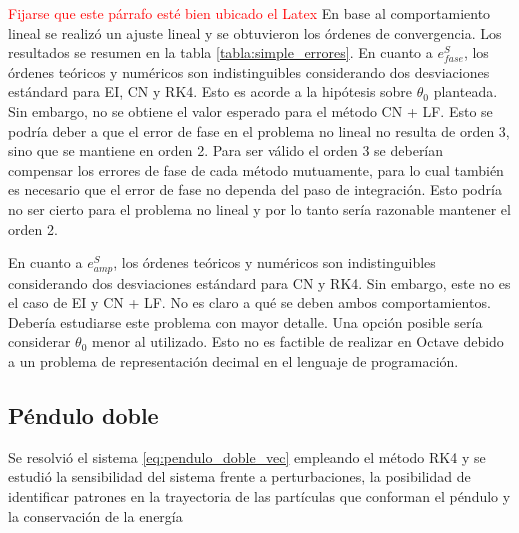 \documentclass[aps,prb,twocolumn,superscriptaddress,floatfix,longbibliography]{revtex4-2}
\newcounter{para}
\begin{document}
\twocolumngrid


\hfill

\textcolor{red}{Fijarse que este párrafo esté bien ubicado el Latex} En base al comportamiento lineal se realizó un ajuste lineal y se obtuvieron los órdenes de convergencia. Los resultados se resumen en la tabla \ref{tabla:simple_errores}. En cuanto a $e^S_{fase}$, los órdenes teóricos y numéricos son indistinguibles considerando dos desviaciones estándard para EI, CN y RK4. Esto es acorde a la hipótesis sobre $\theta_0$ planteada. Sin embargo, no se obtiene el valor esperado para el método CN + LF. Esto se podría deber a que el error de fase en el problema no lineal no resulta de orden 3, sino que se mantiene en orden 2. Para ser válido el orden 3 se deberían compensar los errores de fase de cada método mutuamente, para lo cual también es necesario que el error de fase no dependa del paso de integración. Esto podría no ser cierto para el problema no lineal y por lo tanto sería razonable mantener el orden 2.

En cuanto a $e^S_{amp}$, los órdenes teóricos y numéricos son indistinguibles considerando dos desviaciones estándard para CN y RK4. Sin embargo, este no es el caso de EI y CN + LF. No es claro a qué se deben ambos comportamientos. Debería estudiarse este problema con mayor detalle. Una opción posible sería considerar $\theta_0$ menor al utilizado. Esto no es factible de realizar en Octave debido a un problema de representación decimal en el lenguaje de programación.





\subsection{Péndulo doble}

Se resolvió el sistema \ref{eq:pendulo_doble_vec} empleando el método RK4 y se estudió la sensibilidad del sistema frente a perturbaciones, la posibilidad de identificar patrones en la trayectoria de las partículas que conforman el péndulo y la conservación de la energía
\end{document}
